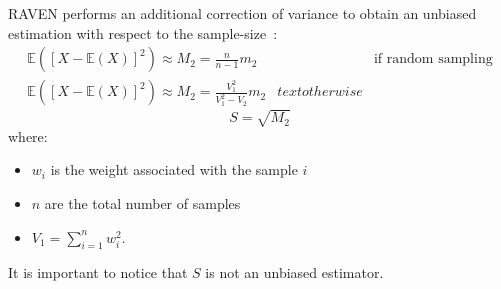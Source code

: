 RAVEN performs an additional correction of variance to obtain an unbiased estimation  with respect to the sample-size~\cite{RimoldiniUnbiased}:
\begin{equation}
\begin{matrix}
\mathbb{E}\left(\left[X - \mathbb{E}(X)\right]^{2}\right)  \approx M_{2} = \displaystyle \frac{n}{n-1}m_{2} & & \text{if random sampling}
\\
\mathbb{E}\left(\left[X - \mathbb{E}(X)\right]^{2}\right)  \approx M_{2} = \frac{V_{1}^{2}}{V_{1}^{2} - V_{2}}m_{2} &  text{otherwise}
\end{matrix}
\end{equation}
\begin{equation}
S = \sqrt{M_{2}} 
\end{equation}
where:
\begin{itemize}
  \item $w_{i}$ is the weight associated with the sample $i$
  \item $n$ are the total number of samples
  \item $V_{1} = \sum_{i=1}^{n} w_{i}^{2}$.
\end{itemize}
It is important to notice that $S$ is not an unbiased estimator.

